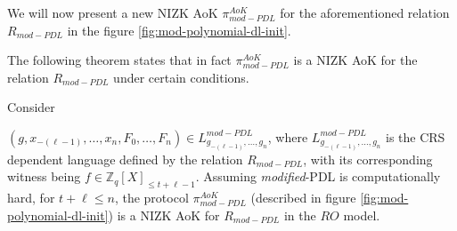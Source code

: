 We will now present a new NIZK AoK $\pi_{mod-PDL}^{AoK}$ for the aforementioned relation 
$R_{mod-PDL}$ in the figure \ref{fig:mod-polynomial-dl-init}.



The following theorem states that in fact $\pi_{mod-PDL}^{AoK}$ is a NIZK AoK for the relation $R_{mod-PDL}$ 
under certain conditions.

\begin{theorem}\label{th:modified_PDL security}
  Consider\par $(g,x_{-(\ell-1)},\dots,x_n,F_0,\dots,F_n)\in L_{g_{-(\ell-1)},\dots,g_n}^{mod-PDL}$, where 
  $L_{g_{-(\ell-1)},\dots,g_n}^{mod-PDL}$ is the CRS dependent language defined by the relation 
  $R_{mod-PDL}$,
  with its corresponding witness being $f\in\mathbb{Z}_q[X]_{\leq t+\ell-1}$.
  Assuming \textit{modified}-PDL is computationally hard, for 
  $t+\ell\leq n$, the protocol $\pi_{mod-PDL}^{AoK}$ (described in figure \ref{fig:mod-polynomial-dl-init}) is a 
  NIZK AoK for $R_{mod-PDL}$ in the $RO$ model.
\end{theorem}
